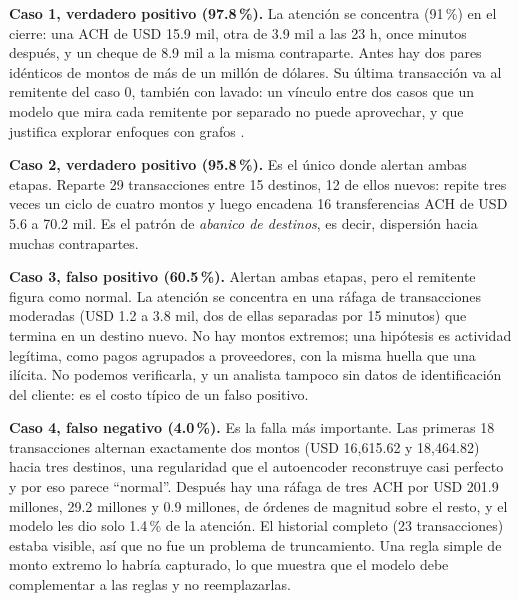 \documentclass[11pt,a4paper]{article}
\begin{document}
\textbf{Caso 1, verdadero positivo (97.8\,\%).} La atención se concentra (91\,\%) en el cierre: una ACH de USD 15.9 mil, otra de 3.9 mil a las 23 h, once minutos después, y un cheque de 8.9 mil a la misma contraparte. Antes hay dos pares idénticos de montos de más de un millón de dólares. Su última transacción va al remitente del caso 0, también con lavado: un vínculo entre dos casos que un modelo que mira cada remitente por separado no puede aprovechar, y que justifica explorar enfoques con grafos \cite{cheng2023}.

\textbf{Caso 2, verdadero positivo (95.8\,\%).} Es el único donde alertan ambas etapas. Reparte 29 transacciones entre 15 destinos, 12 de ellos nuevos: repite tres veces un ciclo de cuatro montos y luego encadena 16 transferencias ACH de USD 5.6 a 70.2 mil. Es el patrón de \emph{abanico de destinos}, es decir, dispersión hacia muchas contrapartes.

\textbf{Caso 3, falso positivo (60.5\,\%).} Alertan ambas etapas, pero el remitente figura como normal. La atención se concentra en una ráfaga de transacciones moderadas (USD 1.2 a 3.8 mil, dos de ellas separadas por 15 minutos) que termina en un destino nuevo. No hay montos extremos; una hipótesis es actividad legítima, como pagos agrupados a proveedores, con la misma huella que una ilícita. No podemos verificarla, y un analista tampoco sin datos de identificación del cliente: es el costo típico de un falso positivo.

\textbf{Caso 4, falso negativo (4.0\,\%).} Es la falla más importante. Las primeras 18 transacciones alternan exactamente dos montos (USD 16,615.62 y 18,464.82) hacia tres destinos, una regularidad que el autoencoder reconstruye casi perfecto y por eso parece ``normal''. Después hay una ráfaga de tres ACH por USD 201.9 millones, 29.2 millones y 0.9 millones, de órdenes de magnitud sobre el resto, y el modelo les dio solo 1.4\,\% de la atención. El historial completo (23 transacciones) estaba visible, así que no fue un problema de truncamiento. Una regla simple de monto extremo lo habría capturado, lo que muestra que el modelo debe complementar a las reglas y no reemplazarlas.
\end{document}
